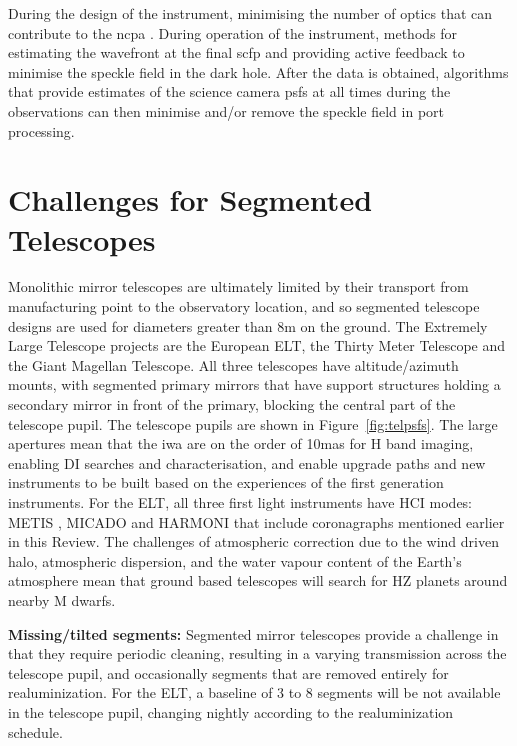 \documentclass[letterpaper]{ar-1col}
\begin{document}
During the design of the instrument, minimising the number of optics that can contribute to the \ac{ncpa} \citep[by making the optics optomechanically and thermally stable; ][]{Absil24}.
%
During operation of the instrument, methods for estimating the wavefront at the final \ac{scfp} and providing active feedback to minimise the speckle field in the dark hole.
%    
After the data is obtained, algorithms that provide estimates of the science camera \acp{psf} at all times during the observations can then minimise and/or remove the speckle field in port processing.

\section{Challenges for Segmented Telescopes}
Monolithic mirror telescopes are ultimately limited by their transport from manufacturing point to the observatory location, and so segmented telescope designs are used for diameters greater than 8m on the ground.
%
The Extremely Large Telescope projects are the European ELT, the Thirty Meter Telescope and the Giant Magellan Telescope.
%
All three telescopes have altitude/azimuth mounts, with segmented primary mirrors that have support structures holding a secondary mirror in front of the primary, blocking the central part of the telescope pupil.
%
The telescope pupils are shown in Figure~\ref{fig:telpsfs}.
%
The large apertures mean that the \ac{iwa} are on the order of 10mas for H band imaging, enabling DI searches and characterisation, and enable upgrade paths and new instruments to be built based on the experiences of the first generation instruments.
%
For the ELT, all three first light instruments have HCI modes: METIS \citep{Brandl22,Absil24}, MICADO \citep{Sturm24,Huby24} and HARMONI \citep{Thatte22,Houlle21} that include coronagraphs mentioned earlier in this Review.
%
The challenges of atmospheric correction due to the wind driven halo, atmospheric dispersion, and the water vapour content of the Earth's atmosphere mean that ground based telescopes will search for HZ planets around nearby M dwarfs.

{\bf Missing/tilted segments:} Segmented mirror telescopes provide a challenge in that they require periodic cleaning, resulting in a varying transmission across the telescope pupil, and occasionally segments that are removed entirely for realuminization.
%
For the ELT, a baseline of 3 to 8 segments will be not available in the telescope pupil, changing nightly according to the realuminization schedule.
\end{document}
